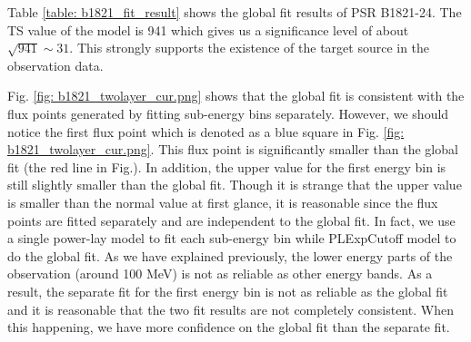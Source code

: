 \documentclass[12pt]{report}
\begin{document}
            Table \ref{table: b1821_fit_result} shows the global fit results of PSR B1821-24. 
            The TS value of the model is 941 which gives us a significance level 
            of about $\sqrt{941} \sim 31$. This strongly supports the existence of the target source in 
            the observation data.

            Fig. \ref{fig: b1821_twolayer_cur.png} shows that the global fit is consistent with 
            the flux points generated by fitting sub-energy bins separately. However, 
            we should notice the first flux point 
            which is denoted as a blue square in Fig. \ref{fig: b1821_twolayer_cur.png}. This 
            flux point is significantly smaller than the global fit (the red line in Fig.). 
            In addition, the upper value for the first energy bin is still slightly smaller than the global fit. 
            Though it is strange that the upper value is smaller than the normal value at first glance, 
            it is reasonable since the flux points are fitted separately and are independent to 
            the global fit. In fact, we use a single power-lay model to fit each sub-energy bin while PLExpCutoff
            model to do the global fit. As we have explained previously, the lower energy parts of the 
            observation (around 100 MeV) is not as reliable as other energy bands. As a result, the separate 
            fit for the first energy bin
            is not as reliable as the global fit and it is reasonable that the two fit results are not completely
            consistent. When this happening, we have more confidence on the global fit than the separate fit.
            
\end{document}
